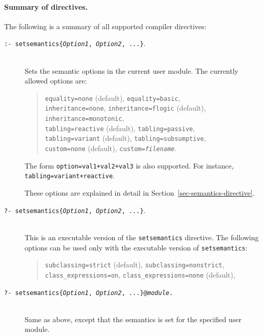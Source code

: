 \documentclass[11pt]{article}
\begin{document}
\paragraph{Summary of directives.}
The following is a summary of all supported compiler directives:
\begin{description}
  \item[{\tt :- setsemantics\{\emph{Option1}, \emph{Option2}, ...\}}.]
%
~~~\\
Sets the semantic options in the current user module.  The currently allowed
options are:
\begin{quote}
{\tt equality=none} (default), {\tt equality=basic},\\
{\tt inheritance=none}, {\tt inheritance=flogic} (default),
\texttt{inheritance=monotonic}, \\
{\tt tabling=reactive} (default), {\tt tabling=passive},\\
{\tt tabling=variant} (default), {\tt tabling=subsumptive},\\
{\tt custom=none} (default), {\tt custom=\emph{filename}}.
\end{quote}
The form \texttt{option=val1+val2+val3} is also supported. For instance,
\texttt{tabling=variant+reactive}.

These options are explained in detail in Section~\ref{sec-semantics-directive}.
\item[{\tt ?- setsemantics\{\emph{Option1}, \emph{Option2}, ...\}}.]
  ~~~\\
  This is an executable version of the {\tt setsemantics} directive.
  The following options can be used only with the executable version of
  \texttt{setsemantics}:
  \begin{quote}
    {\tt subclassing=strict} (default), {\tt subclassing=nonstrict},\\
    {\tt class\_expressions=on}, {\tt class\_expressions=none} (default),\\
  \end{quote}
\item[{\tt ?- setsemantics\{\emph{Option1}, \emph{Option2}, ...\}@\emph{module}.}]
  ~~~\\
  Same as above, except that the semantics is set for the specified user module.
  

\end{description}
\end{document}
